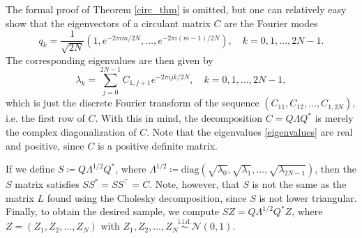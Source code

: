 The formal proof of Theorem \ref{circ_thm} is omitted, but one can relatively easy show that the eigenvectors of a circulant matrix $C$ are the Fourier modes
\begin{equation}
    q_{k}=\frac{1}{\sqrt{2N}}\left(1,e^{-2\pi i m/2N},\dots,e^{-2\pi i(m-1)/2N}\right),\quad k=0,1,\dots,2N-1.
\end{equation}
The corresponding eigenvalues are then given by
\begin{equation}
    \lambda_{k}=\sum_{j=0}^{2N-1}C_{1,j+1}e^{-2\pi ijk/2N}, \quad k=0,1,\dots,2N-1,
\end{equation}
which is just the discrete Fourier transform of the sequence $(C_{11},C_{12},\dots,C_{1,2N})$, i.e. the first row of $C$. With this in mind, the decomposition $C=Q\Lambda Q^{*}$ is merely the complex diagonalization of $C$.
Note that the eigenvalues \eqref{eigenvalues} are real and positive, since $C$ is a positive definite matrix. 

If we define $S\coloneqq Q \Lambda^{1/2}Q^{*}$, where $\Lambda^{1/2}\coloneqq \textrm{diag}(\sqrt{\lambda_{0}},\sqrt{\lambda_{1}},\dots,\sqrt{\lambda_{2N-1}})$, then the $S$ matrix satisfies $SS^{*}=SS^{\top}=C$. Note, however, that $S$ is not the same as the matrix $L$ found using the Cholesky decomposition, since $S$ is not lower triangular. Finally, to obtain the desired sample, we compute $SZ=Q\Lambda^{1/2}Q^{*}Z$, where $Z=(Z_{1},Z_{2},\dots,Z_{N})$ with $Z_{1},Z_{2},\dots,Z_{N}\overset{\textrm{i.i.d.}}{\sim}\mathcal{N}(0,1)$.

